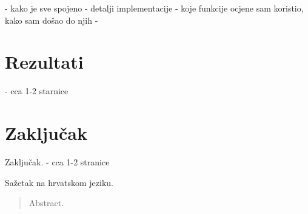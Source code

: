 \documentclass[times, utf8, zavrsni]{fer}
\begin{document}
- kako je sve spojeno
- detalji implementacije - koje funkcije ocjene sam koristio, kako sam došao do njih
- 

\chapter{Rezultati}
- cca 1-2 starnice

\chapter{Zaključak}
Zaključak.
- cca 1-2 stranice

{}


\begin{sazetak}
Sažetak na hrvatskom jeziku.

\end{sazetak}

\begin{abstract}
Abstract.

\end{abstract}
\end{document}
